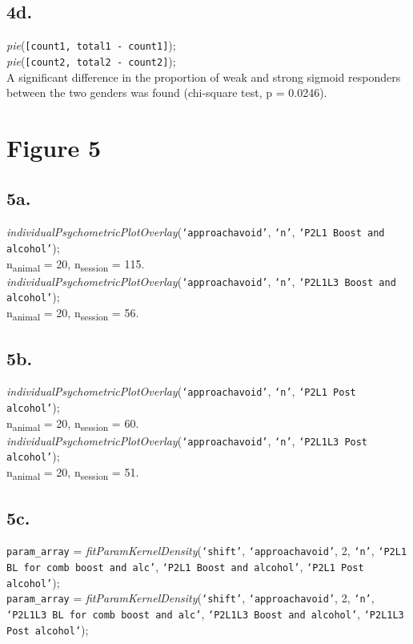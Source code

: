 \documentclass{article}
\begin{document}
\subsection{4d.}
\emph{pie}(\texttt{[count1, total1 - count1]});\\
\emph{pie}(\texttt{[count2, total2 - count2]});\\

A significant difference in the proportion of weak and strong sigmoid responders between the two genders was found (chi-square test, p = 0.0246).


\section{Figure 5}
\subsection{5a.}
\emph{individualPsychometricPlotOverlay}(\texttt{`approachavoid'}, \texttt{`n'}, \texttt{`P2L1 Boost and alcohol'});\\
n\textsubscript{animal} = 20, n\textsubscript{session} = 115.\\
\newline
\emph{individualPsychometricPlotOverlay}(\texttt{`approachavoid'}, \texttt{`n'}, \texttt{`P2L1L3 Boost and alcohol'});\\
n\textsubscript{animal} = 20, n\textsubscript{session} = 56.\\

\subsection{5b.}
\emph{individualPsychometricPlotOverlay}(\texttt{`approachavoid'}, \texttt{`n'}, \texttt{`P2L1 Post alcohol'});\\
n\textsubscript{animal} = 20, n\textsubscript{session} = 60.\\
\newline
\emph{individualPsychometricPlotOverlay}(\texttt{`approachavoid'}, \texttt{`n'}, \texttt{`P2L1L3 Post alcohol'});\\
n\textsubscript{animal} = 20, n\textsubscript{session} = 51.\\

\subsection{5c.}
\texttt{param\_array} = \emph{fitParamKernelDensity}(\texttt{`shift'}, \texttt{`approachavoid'}, 2, \texttt{`n'}, \texttt{`P2L1 BL for comb boost and alc'}, \texttt{`P2L1 Boost and alcohol'}, \texttt{`P2L1 Post alcohol'});\\
\texttt{param\_array} = \emph{fitParamKernelDensity}(\texttt{`shift'}, \texttt{`approachavoid'}, 2, \texttt{`n'}, \texttt{`P2L1L3 BL for comb boost and alc'}, \texttt{`P2L1L3 Boost and alcohol'}, \texttt{`P2L1L3 Post alcohol'});\\
\end{document}
